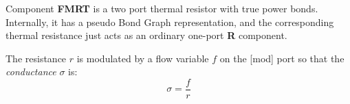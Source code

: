 Component \textbf{FMRT} is a two port thermal resistor with true power
bonds. Internally, it has a pseudo Bond Graph representation, and the
corresponding thermal resistance just acts as an ordinary one-port
\textbf{R} component.

The resistance $r$ is modulated by a flow variable $f$ on the [mod] port
so that the {\em conductance\/} $\sigma$ is:
\begin{equation}
  \sigma = \frac{f}{r} 
\end{equation}

